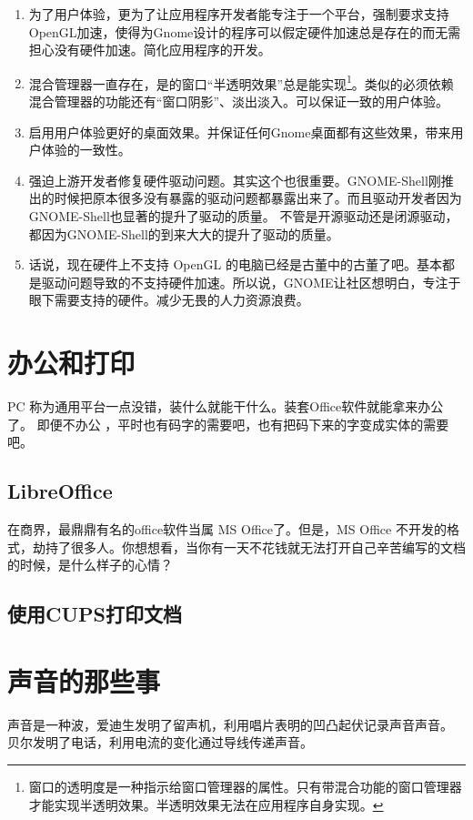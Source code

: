 \begin{enumerate}
\item 为了用户体验，更为了让应用程序开发者能专注于一个平台，强制要求支持OpenGL加速，使得为Gnome设计的程序可以假定硬件加速总是存在的而无需担心没有硬件加速。简化应用程序的开发。
\item 混合管理器一直存在，是的窗口“半透明效果”总是能实现\footnote{窗口的透明度是一种指示给窗口管理器的属性。只有带混合功能的窗口管理器才能实现半透明效果。半透明效果无法在应用程序自身实现。}。类似的必须依赖混合管理器的功能还有“窗口阴影”、淡出淡入。可以保证一致的用户体验。
\item 启用用户体验更好的桌面效果。并保证任何Gnome桌面都有这些效果，带来用户体验的一致性。
\item 强迫上游开发者修复硬件驱动问题。其实这个也很重要。GNOME-Shell刚推出的时候把原本很多没有暴露的驱动问题都暴露出来了。而且驱动开发者因为GNOME-Shell也显著的提升了驱动的质量。
不管是开源驱动还是闭源驱动，都因为GNOME-Shell的到来大大的提升了驱动的质量。

\item 话说，现在硬件上不支持 OpenGL 的电脑已经是古董中的古董了吧。基本都是驱动问题导致的不支持硬件加速。所以说，GNOME让社区想明白，专注于眼下需要支持的硬件。减少无畏的人力资源浪费。
\end{enumerate}



\section{办公和打印}

PC 称为通用平台一点没错，装什么就能干什么。装套Office软件就能拿来办公了。
即便不办公 ，平时也有码字的需要吧，也有把码下来的字变成实体的需要吧。


\subsection{LibreOffice}

在商界，最鼎鼎有名的office软件当属 MS Office了。但是，MS Office 不开发的格式，劫持了很多人。你想想看，当你有一天不花钱就无法打开自己辛苦编写的文档的时候，是什么样子的心情？



\subsection{使用CUPS打印文档}

\section{声音的那些事}
声音是一种波，爱迪生发明了留声机，利用唱片表明的凹凸起伏记录声音声音。
贝尔发明了电话，利用电流的变化通过导线传递声音。

